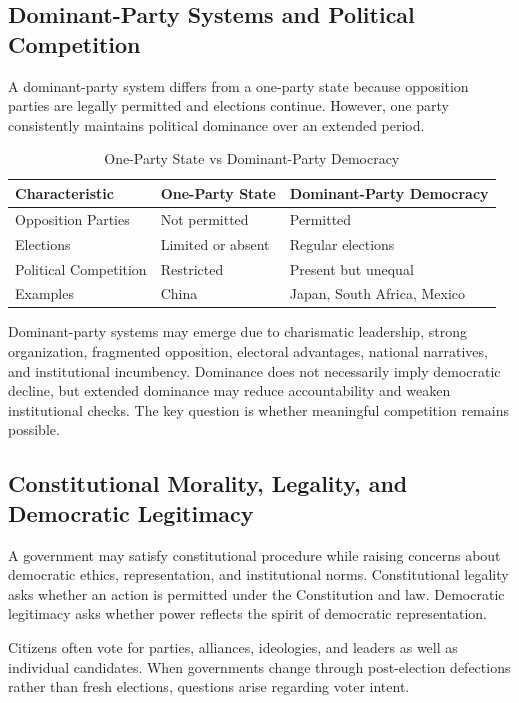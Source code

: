 \documentclass[11pt]{article}
\begin{document}
\subsection{Dominant-Party Systems and Political Competition}
A dominant-party system differs from a one-party state because opposition parties are legally permitted and elections continue. However, one party consistently maintains political dominance over an extended period.

\begin{table}[h]
\centering
\caption{One-Party State vs Dominant-Party Democracy}
\begin{tabular}{lll}
\toprule
Characteristic & One-Party State & Dominant-Party Democracy\\
\midrule
Opposition Parties & Not permitted & Permitted\\
Elections & Limited or absent & Regular elections\\
Political Competition & Restricted & Present but unequal\\
Examples & China & Japan, South Africa, Mexico\\
\bottomrule
\end{tabular}
\end{table}

Dominant-party systems may emerge due to charismatic leadership, strong organization, fragmented opposition, electoral advantages, national narratives, and institutional incumbency. Dominance does not necessarily imply democratic decline, but extended dominance may reduce accountability and weaken institutional checks. The key question is whether meaningful competition remains possible.

\subsection{Constitutional Morality, Legality, and Democratic Legitimacy}
A government may satisfy constitutional procedure while raising concerns about democratic ethics, representation, and institutional norms. Constitutional legality asks whether an action is permitted under the Constitution and law. Democratic legitimacy asks whether power reflects the spirit of democratic representation.

Citizens often vote for parties, alliances, ideologies, and leaders as well as individual candidates. When governments change through post-election defections rather than fresh elections, questions arise regarding voter intent.
\end{document}
